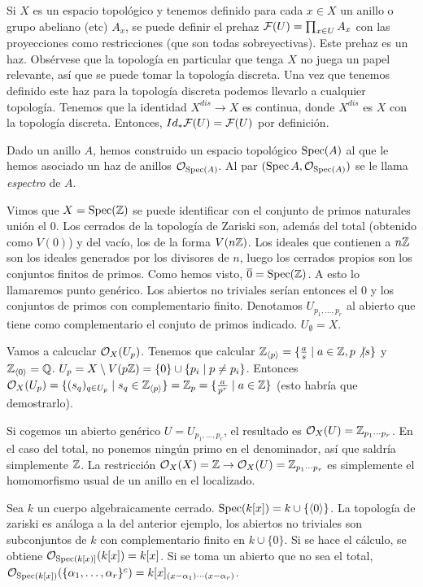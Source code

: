 \documentclass[GA.tex]{subfiles}
\begin{document}
\begin{nota}
Si $X$ es un espacio topológico y tenemos definido para cada $x\in X$ un anillo o grupo abeliano (etc) $A_x$, se puede definir el prehaz $\mathcal{F}(U)=\prod_{x\in U} A_x$ con las proyecciones como restricciones (que son todas sobreyectivas). Este prehaz es un haz. Obsérvese que la topología en particular que tenga $X$ no juega un papel relevante, así que se puede tomar la topología discreta. Una vez que tenemos definido este haz para la topología discreta podemos llevarlo a cualquier topología. Tenemos que la identidad $X^{dis}\to X$ es continua, donde $X^{dis}$ es $X$ con la topología discreta. Entonces, $Id_*\mathcal{F}(U)=\mathcal{F}(U)$ por definición. 
\end{nota}

Dado un anillo $A$, hemos construido un espacio topológico $\operatorname{Spec}(A)$ al que le hemos asociado un haz de anillos ${\mathcal O}_{\operatorname{Spec}(A)}$. Al par $(\operatorname{Spec}{A}, {\mathcal O}_{\operatorname{Spec}(A)})$ se le llama \emph{espectro} de $A$. 


\begin{ej}
Vimos que $X=\operatorname{Spec}(\mathbb{Z})$ se puede identificar con el conjunto de primos naturales unión el 0. Los cerrados de la topología de Zariski son, además del total (obtenido como $V(0)$) y del vacío, los de la forma $V(n\mathbb{Z})$. Los ideales que contienen a $n\mathbb{Z}$ son los ideales generados por los divisores de $n$, luego los cerrados propios son los conjuntos finitos de primos. Como hemos visto, $\overline{0}=\operatorname{Spec}(\mathbb{Z})$. A esto lo llamaremos punto genérico. Los abiertos no triviales serían entonces el 0 y los conjuntos de primos con complementario finito. Denotamos $U_{p_1,\dots, p_r}$ al abierto que tiene como complementario el conjuto de primos indicado.  $U_\emptyset=X$. 

Vamos a calcuclar ${\mathcal O}_X(U_{p})$. Tenemos que calcular $\mathbb{Z}_{\langle{p}\rangle}=\{\frac{a}{s}\mid a\in\mathbb{Z}, p\not| s\}$ y $\mathbb{Z}_{\langle{0}\rangle}=\mathbb{Q}$.  $U_{p}=X\setminus V(p\mathbb{Z})=\{0\}\cup\{p_i\mid p\neq p_i\}$. Entonces ${\mathcal O}_X(U_p)=\{(s_q)_{q\in U_p}\mid s_q\in\mathbb{Z}_{\langle{p}\rangle}\}=\mathbb{Z}_p=\{\frac{a}{p^r}\mid a\in\mathbb{Z}\}$ (esto habría que demostrarlo). 

Si cogemos un abierto genérico $U=U_{p_1,\dots, p_r}$, el resultado es ${\mathcal O}_X(U)=\mathbb{Z}_{p_1\cdots p_r}$. En el caso del total, no ponemos ningún primo en el denominador, así que saldría simplemente $\mathbb{Z}$. La restricción ${\mathcal O}_X(X)=\mathbb{Z}\to {\mathcal O}_X(U)=\mathbb{Z}_{p_1\cdots p_r}$ es simplemente el homomorfismo usual de un anillo en el localizado. 
\end{ej}

\begin{ej}
Sea $k$ un cuerpo algebraicamente cerrado. $\operatorname{Spec}(k[x])=k\cup\{\langle{0}\rangle\}$. La topología de zariski es análoga a la del anterior ejemplo, los abiertos no triviales son subconjuntos de $k$ con complementario finito en $k\cup\{0\}$. Si se hace el cálculo, se obtiene ${\mathcal O}_{\operatorname{Spec}(k[x)]}(k[x])=k[x]$. Si se toma un abierto que no sea el total, ${\mathcal O}_{\operatorname{Spec}(k[x])}(\{\alpha_1,\dots,\alpha_r\}^c)=k[x]_{(x-\alpha_1)\cdots(x-\alpha_r)}$. 
\end{ej}
\end{document}
